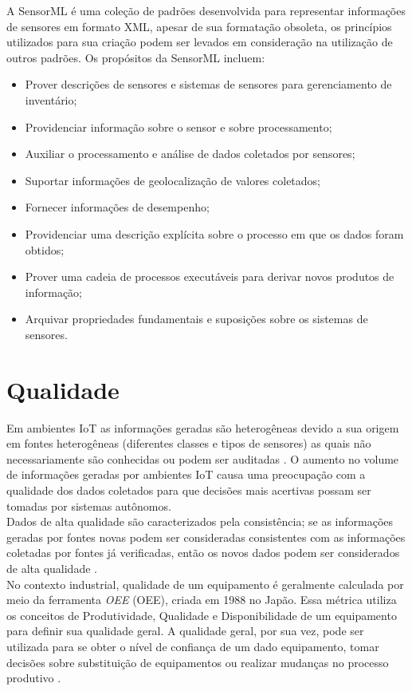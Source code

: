      \quad A \acrfull{SensorML} \cite{SML} é uma coleção de padrões
    desenvolvida para representar informações de sensores em formato XML, apesar de sua formatação obsoleta, os princípios utilizados para sua criação podem ser levados em consideração na utilização de outros padrões. Os propósitos da \acrshort{SensorML} incluem:
    \begin{itemize}
      \item Prover descrições de sensores e sistemas de sensores para gerenciamento de inventário;
      \item Providenciar informação sobre o sensor e sobre processamento;
      \item Auxiliar o processamento e análise de dados coletados por sensores;
      \item Suportar informações de geolocalização de valores coletados;
      \item Fornecer informações de desempenho;
      \item Providenciar uma descrição explícita sobre o processo em que os dados foram obtidos;
      \item Prover uma cadeia de processos executáveis para derivar novos produtos de informação;
      \item Arquivar propriedades fundamentais e suposições sobre os sistemas de sensores.
    \end{itemize}
\section{Qualidade}
\label{sec:qualidade}
\quad Em ambientes \acrshort{IoT} as informações geradas são heterogêneas devido a sua origem em fontes heterogêneas (diferentes classes e tipos de sensores) as quais não necessariamente são conhecidas ou podem ser auditadas \cite{dataquality}. O aumento no volume de informações geradas por ambientes \acrshort{IoT} causa uma preocupação com a qualidade dos dados coletados para que decisões mais acertivas possam ser tomadas por sistemas autônomos.
\\\null\quad Dados de alta qualidade são caracterizados pela consistência; se as informações geradas por fontes novas podem ser consideradas consistentes com as informações coletadas por fontes já verificadas, então os novos dados podem ser considerados de alta qualidade \cite{dataquality}.
\\\null\quad No contexto industrial, qualidade de um equipamento é geralmente calculada por meio da ferramenta \textit{\acrlong{OEE}} (\acrshort{OEE}), criada em 1988 no Japão. Essa métrica utiliza os conceitos de Produtividade, Qualidade e Disponibilidade de um equipamento para definir sua qualidade geral. A qualidade geral, por sua vez, pode ser utilizada para se obter o nível de confiança de um dado equipamento, tomar decisões sobre substituição de equipamentos ou realizar mudanças no processo produtivo \cite{artigoOEE}.

